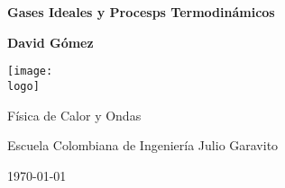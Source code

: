 \documentclass{article}
\newcommand{\logo}{"logo-eci-invert.png"}
\newcommand{\titlename}{Gases Ideales y Procesps Termodinámicos}
\renewcommand{\author}{{David Gómez}}
\begin{document}
\begin{titlepage}
    \begin{center}
        \vspace{1cm}

        \textbf{\Huge{\titlename}}

        \vspace{1.5cm}

        \textbf{\large{\author}}

        \vspace{3cm}

        \texttt{[image: \\logo]}
        
        \vfill

        Física de Calor y Ondas

        Escuela Colombiana de Ingeniería Julio Garavito

        \today
    \end{center}
\end{titlepage}

\clearpage
\tableofcontents






\end{document}
